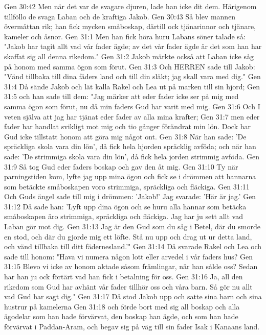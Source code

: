 Gen 30:42  Men när det var de svagare djuren, lade han icke dit dem. Härigenom tillföllo de svaga Laban och de kraftiga Jakob.
Gen 30:43  Så blev mannen övermåttan rik; han fick mycken småboskap, därtill ock tjänarinnor och tjänare, kameler och åsnor.
Gen 31:1  Men han fick höra huru Labans söner talade så: "Jakob har tagit allt vad vår fader ägde; av det vår fader ägde är det som han har skaffat sig all denna rikedom."
Gen 31:2  Jakob märkte också att Laban icke såg på honom med samma ögon som förut.
Gen 31:3  Och HERREN sade till Jakob: "Vänd tillbaka till dina fäders land och till din släkt; jag skall vara med dig."
Gen 31:4  Då sände Jakob och lät kalla Rakel och Lea ut på marken till sin hjord;
Gen 31:5  och han sade till dem: "Jag märker att eder fader icke ser på mig med samma ögon som förut, nu då min faders Gud har varit med mig.
Gen 31:6  Och I veten själva att jag har tjänat eder fader av alla mina krafter;
Gen 31:7  men eder fader har handlat svikligt mot mig och tio gånger förändrat min lön. Dock har Gud icke tillstatt honom att göra mig något ont.
Gen 31:8  När han sade: 'De spräckliga skola vara din lön', då fick hela hjorden spräcklig avföda; och när han sade: 'De strimmiga skola vara din lön', då fick hela jorden strimmig avföda.
Gen 31:9  Så tog Gud eder faders boskap och gav den åt mig.
Gen 31:10  Ty när parningstiden kom, lyfte jag upp mina ögon och fick se i drömmen att hannarna som betäckte småboskapen voro strimmiga, spräckliga och fläckiga.
Gen 31:11  Och Guds ängel sade till mig i drömmen: 'Jakob!' Jag svarade: 'Här är jag.'
Gen 31:12  Då sade han: 'Lyft upp dina ögon och se huru alla hannar som betäcka småboskapen äro strimmiga, spräckliga och fläckiga. Jag har ju sett allt vad Laban gör mot dig.
Gen 31:13  Jag är den Gud som du såg i Betel, där du smorde en stod, och där du gjorde mig ett löfte. Stå nu upp och drag ut ur detta land, och vänd tillbaka till ditt fädernesland.'"
Gen 31:14  Då svarade Rakel och Lea och sade till honom: "Hava vi numera någon lott eller arvedel i vår faders hus?
Gen 31:15  Blevo vi icke av honom aktade såsom främlingar, när han sålde oss? Sedan har han ju ock förtärt vad han fick i betalning för oss.
Gen 31:16  Ja, all den rikedom som Gud har avhänt vår fader tillhör oss och våra barn. Så gör nu allt vad Gud har sagt dig."
Gen 31:17  Då stod Jakob upp och satte sina barn och sina hustrur på kamelerna
Gen 31:18  och förde bort med sig all boskap och alla ägodelar som han hade förvärvat, den boskap han ägde, och som han hade förvärvat i Paddan-Aram, och begav sig på väg till sin fader Isak i Kanaans land.
